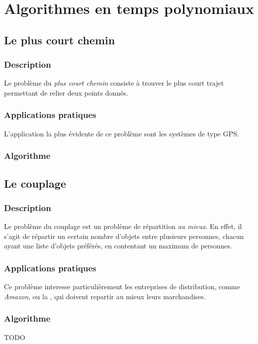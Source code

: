 \section{Algorithmes en temps polynomiaux}
    \subsection{Le plus court chemin}
        \subsubsection{Description}
        Le problème du \emph{plus court chemin} consiste à trouver
        le plus court trajet permettant de relier deux points donnés.
        \subsubsection{Applications pratiques}
            L'application la plus évidente de ce problème sont les systèmes de type
            GPS.
        \subsubsection{Algorithme}

    \subsection{Le couplage}
        \subsubsection{Description}
            Le problème du couplage est un problème de répartition \emph{au mieux}.
            En effet, il s'agit de répartir un certain nombre d'objets
            entre plusieurs personnes, chacun ayant une liste d'objets
            préférés, en contentant un maximum de personnes.
        \subsubsection{Applications pratiques}
            Ce problème interesse particulièrement les entreprises
            de distribution, comme \emph{Amazon},
            ou la , qui doivent
            repartir au mieux leurs marchandises.
        \subsubsection{Algorithme}
            TODO



